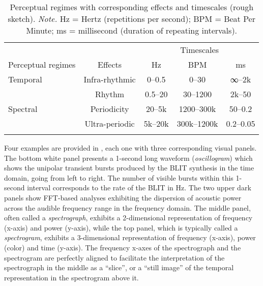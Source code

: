 \begin{table}
\caption{\label{tab:priorsTimeScales}Perceptual regimes with corresponding effects and timescales (rough sketch). \textit{Note.} Hz = Hertz (repetitions per second); BPM = Beat Per Minute; ms = millisecond (duration of repeating intervals).}
\begin{tabular}{lcccc}
\lsptoprule
& & \multicolumn{3}{c}{{Timescales}}\\\cmidrule(lr){3-5}
Perceptual regimes & Effects & Hz & BPM & ms \\\midrule
Temporal & \multicolumn{1}{c}{\color{gray}Infra-rhythmic} & \multicolumn{1}{c}{\color{gray}0--0.5} & \multicolumn{1}{c}{\color{gray}0--30} & \multicolumn{1}{c}{\color{gray}∞--2k} \\
& \multicolumn{1}{c}{Rhythm} & \multicolumn{1}{c}{0.5--20} & \multicolumn{1}{c}{30--1200} & \multicolumn{1}{c}{2k--50} \\\midrule
Spectral & \multicolumn{1}{c}{Periodicity} & \multicolumn{1}{c}{20--5k} & \multicolumn{1}{c}{1200--300k} & \multicolumn{1}{c}{50--0.2} \\
& \multicolumn{1}{c}{\color{gray}Ultra-periodic} & \multicolumn{1}{c}{\color{gray}5k--20k} & \multicolumn{1}{c}{\color{gray}300k--1200k} & \multicolumn{1}{c}{\color{gray}0.2--0.05} \\
\lspbottomrule
\end{tabular}
\end{table}

Four examples are provided in , each one with three corresponding visual panels. The bottom white panel presents a 1-second long waveform (\emph{oscillogram}) which shows the unipolar transient bursts produced by the BLIT synthesis in the time domain, going from left to right. The number of visible bursts within this 1-second interval corresponds to the rate of the BLIT in Hz. The two upper dark panels show FFT-based analyses exhibiting the dispersion of acoustic power across the audible frequency range in the frequency domain. The middle panel, often called a \emph{spectrograph}, exhibits a 2-dimensional representation of frequency (x-axis) and power (y-axis), while the top panel, which is typically called a \emph{spectrogram}, exhibits a 3-dimensional representation of frequency (x-axis), power (color) and time (y-axis). The frequency x-axes of the spectrograph and the spectrogram are perfectly aligned to facilitate the interpretation of the spectrograph in the middle as a \enquote{slice}, or a \enquote{still image} of the temporal representation in the spectrogram above it.



